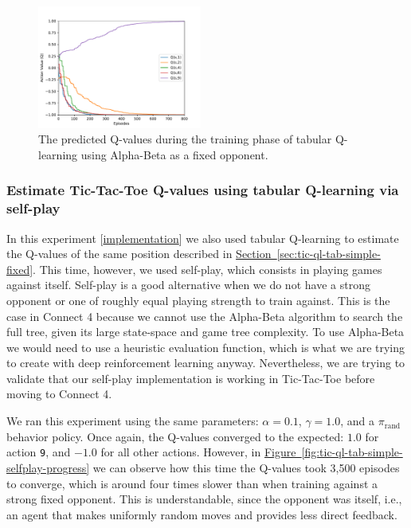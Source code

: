 \documentclass{article}
\newcommand{\GithubURL}[1]{[\href{https://github.com/davidrobles/mlnd-capstone-code/blob/master/#1}{implementation}]}
\begin{document}

\begin{figure}[!h]
    \centering
    \includegraphics[width=0.48\textwidth]{figures/tic_ql_tab_action_values.pdf}
    \caption{The predicted Q-values during the training phase of tabular
             Q-learning using Alpha-Beta as a fixed opponent.}
    \label{fig:tic-ql-tab-qvalues-progress}
\end{figure}

\subsubsection{Estimate Tic-Tac-Toe Q-values using tabular Q-learning via self-play}

In this experiment \GithubURL{experiments/tic_ql_tab_simple_selfplay.py} we also used tabular
Q-learning to estimate the Q-values of the same position described in
\hyperref[sec:tic-ql-tab-simple-fixed] {Section~\ref*{sec:tic-ql-tab-simple-fixed}}. This time,
however, we used self-play, which consists in playing games against itself. Self-play is a good
alternative when we do not have a strong opponent or one of roughly equal playing strength to train
against. This is the case in Connect 4 because we cannot use the Alpha-Beta algorithm to search the
full tree, given its large state-space and game tree complexity. To use Alpha-Beta we would need to
use a heuristic evaluation function, which is what we are trying to create with deep reinforcement
learning anyway. Nevertheless, we are trying to validate that our self-play implementation is
working in Tic-Tac-Toe before moving to Connect 4.

We ran this experiment using the same parameters: $\alpha = 0.1$, $\gamma=1.0$, and a
$\pi_{\textrm{rand}}$ behavior policy. Once again, the Q-values converged to the expected: $1.0$ for
action \texttt{9}, and $-1.0$ for all other actions. However, in
\hyperref[fig:tic-ql-tab-simple-selfplay-progress]
{Figure~\ref*{fig:tic-ql-tab-simple-selfplay-progress}} we can observe how this time the Q-values
took 3,500 episodes to converge, which is around four times slower than when training against a
strong fixed opponent. This is understandable, since the opponent was itself, i.e., an agent that
makes uniformly random moves and provides less direct feedback.
\end{document}
